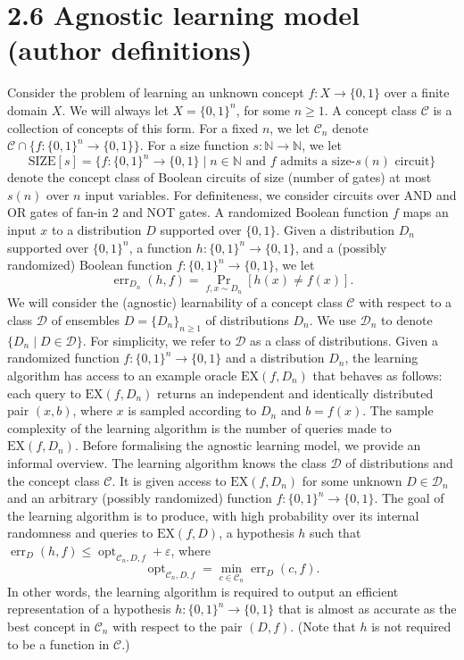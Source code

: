 \documentclass[10pt,a4paper]{article}
\begin{document}
\section*{2.6 Agnostic learning model (author definitions)}
Consider the problem of learning an unknown concept $f:X\to\{0,1\}$ over a finite domain $X$. We will always let $X=\{0,1\}^n$, for some $n\geq1$. A concept class $\mathcal C$ is a collection of concepts of this form. For a fixed $n$, we let $\mathcal C_n$ denote $\mathcal C\cap\{f:\{0,1\}^n\to\{0,1\}\}$. For a size function $s:\mathbb N\to\mathbb N$, we let
\[\mathrm{SIZE}[s]=\{f:\{0,1\}^n\to\{0,1\}\mid n\in\mathbb N\text{ and }f\text{ admits a size-}s(n)\text{ circuit}\}\]
denote the concept class of Boolean circuits of size (number of gates) at most $s(n)$ over $n$ input variables. For definiteness, we consider circuits over AND and OR gates of fan-in $2$ and NOT gates.
A randomized Boolean function $f$ maps an input $x$ to a distribution $D$ supported over $\{0,1\}$. Given a distribution $D_n$ supported over $\{0,1\}^n$, a function $h:\{0,1\}^n\to\{0,1\}$, and a (possibly randomized) Boolean function $f:\{0,1\}^n\to\{0,1\}$, we let
\[\operatorname{err}_{D_n}(h,f)=\Pr_{f,x\sim D_n}[h(x)\neq f(x)].\]
We will consider the (agnostic) learnability of a concept class $\mathcal C$ with respect to a class $\mathcal D$ of ensembles $D=\{D_n\}_{n\geq1}$ of distributions $D_n$. We use $\mathcal D_n$ to denote $\{D_n\mid D\in\mathcal D\}$. For simplicity, we refer to $\mathcal D$ as a class of distributions.
Given a randomized function $f:\{0,1\}^n\to\{0,1\}$ and a distribution $D_n$, the learning algorithm has access to an example oracle $\mathrm{EX}(f,D_n)$ that behaves as follows: each query to $\mathrm{EX}(f,D_n)$ returns an independent and identically distributed pair $(x,b)$, where $x$ is sampled according to $D_n$ and $b=f(x)$. The sample complexity of the learning algorithm is the number of queries made to $\mathrm{EX}(f,D_n)$.
Before formalising the agnostic learning model, we provide an informal overview. The learning algorithm knows the class $\mathcal D$ of distributions and the concept class $\mathcal C$. It is given access to $\mathrm{EX}(f,D_n)$ for some unknown $D\in\mathcal D_n$ and an arbitrary (possibly randomized) function $f:\{0,1\}^n\to\{0,1\}$. The goal of the learning algorithm is to produce, with high probability over its internal randomness and queries to $\mathrm{EX}(f,D)$, a hypothesis $h$ such that $\operatorname{err}_D(h,f)\leq\operatorname{opt}_{\mathcal C_n,D,f}+\varepsilon$, where
\[\operatorname{opt}_{\mathcal C_n,D,f}=\min_{c\in\mathcal C_n}\operatorname{err}_D(c,f).\]
In other words, the learning algorithm is required to output an efficient representation of a hypothesis $h:\{0,1\}^n\to\{0,1\}$ that is almost as accurate as the best concept in $\mathcal C_n$ with respect to the pair $(D,f)$. (Note that $h$ is not required to be a function in $\mathcal C$.)
\end{document}
